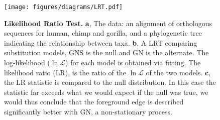 \begin{figure}[!ht]
\centering
\texttt{[image: figures/diagrams/LRT.pdf]}
\caption{\textbf{Likelihood Ratio Test.} \textbf{a}, The data: an alignment of orthologous sequences for human, chimp and gorilla, and a phylogenetic tree indicating the relationship between taxa. \textbf{b}, A LRT comparing substitution models, GNS is the null and GN is the alternate. The log-likelihood ($\ln\mathcal{L}$) for each model is obtained via fitting. The likelihood ratio (LR), is the ratio of the $\ln\mathcal{L}$ of the two models. \textbf{c}, the LR statistic is compared to the null distribution. In this case the statistic far exceeds what we would expect if the null was true, we would thus conclude that the foreground edge is described significantly better with GN, a non-stationary process.}
\label{fig:lrt}
\end{figure}